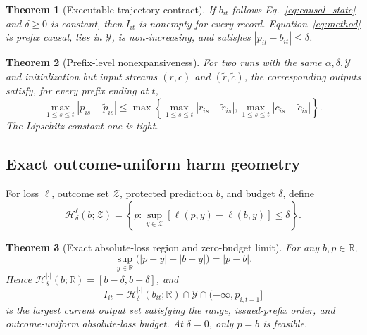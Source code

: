 \documentclass[preprint,12pt]{elsarticle}
\newtheorem{theorem}{Theorem}
\begin{document}
\begin{theorem}[Executable trajectory contract]
\label{thm:pchp}
If \(b_{it}\) follows Eq.~\eqref{eq:causal_state} and \(\delta\geq0\) is constant, then \(I_{it}\) is nonempty for every record. Equation~\eqref{eq:method} is prefix causal, lies in \(\mathcal Y\), is non-increasing, and satisfies \(|p_{it}-b_{it}|\leq\delta\).
\end{theorem}

\begin{theorem}[Prefix-level nonexpansiveness]
\label{thm:nonexpansive}
For two runs with the same \(\alpha,\delta,\mathcal Y\) and initialization but input streams \((r,c)\) and \((\widetilde r,\widetilde c)\), the corresponding outputs satisfy, for every prefix ending at \(t\),
\begin{equation}
 \max_{1\leq s\leq t}|p_{is}-\widetilde p_{is}|
 \leq
 \max\!\left\{
 \max_{1\leq s\leq t}|r_{is}-\widetilde r_{is}|,
 \max_{1\leq s\leq t}|c_{is}-\widetilde c_{is}|
 \right\}.
 \label{eq:prefix_nonexpansive}
\end{equation}
The Lipschitz constant one is tight.
\end{theorem}

\subsection{Exact outcome-uniform harm geometry}

For loss \(\ell\), outcome set \(\mathcal Z\), protected prediction \(b\), and budget \(\delta\), define
\begin{equation}
 \mathcal H^\ell_\delta(b;\mathcal Z)
 =\left\{p:\sup_{y\in\mathcal Z}
 [\ell(p,y)-\ell(b,y)]\leq\delta\right\}.
 \label{eq:generic_harm_region}
\end{equation}

\begin{theorem}[Exact absolute-loss region and zero-budget limit]
\label{thm:harm_region}
For any \(b,p\in\mathbb R\),
\begin{equation}
 \sup_{y\in\mathbb R}\bigl(|p-y|-|b-y|\bigr)=|p-b|.
 \label{eq:harm_region}
\end{equation}
Hence \(\mathcal H^{|\cdot|}_\delta(b;\mathbb R)=[b-\delta,b+\delta]\), and
\begin{equation}
 I_{it}=\mathcal H^{|\cdot|}_\delta(b_{it};\mathbb R)
 \cap\mathcal Y\cap(-\infty,p_{i,t-1}]
 \label{eq:maximal_interval}
\end{equation}
is the largest current output set satisfying the range, issued-prefix order, and outcome-uniform absolute-loss budget. At \(\delta=0\), only \(p=b\) is feasible.
\end{theorem}
\end{document}
